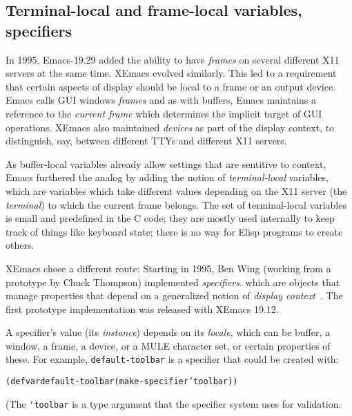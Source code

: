 \documentclass[format=acmsmall, review=false, screen=true]{acmart}
\newcommand \Elisp {Elisp}
\begin{document}



\subsection{Terminal-local and frame-local variables, specifiers}

In 1995, Emacs-19.29 added the ability to have \emph{frames} on
several different X11 servers at the same time.  XEmacs evolved
similarly.  This led to a requirement that certain aspects of display
should be local to a frame or an output device.  Emacs calls GUI
windows \emph{frames} and as with buffers, Emacs maintains a reference
to the \emph{current frame} which determines the implicit target of
GUI operations.  XEmacs also maintained \emph{devices} as part of
the display context, to distinguish, say, between different TTYs and
different X11 servers.

As buffer-local variables already allow settings that are sentitive to
context, Emacs furthered the analog by adding the notion of
\emph{terminal-local} variables, which are variables which take
different values depending on the X11 server (the \emph{terminal}) to
which the current frame belongs.  The set of terminal-local variables
is small and predefined in the C code; they are mostly used internally
to keep track of things like keyboard state; there is no way for
\Elisp{} programs to create others.

XEmacs chose a different route: Starting in 1995, Ben Wing (working
from a prototype by Chuck Thompson) implemented
\emph{specifiers}. which are objects that manage properties that
depend on a generalized notion of \emph{display
  context}~\cite{XEmacsLispRef1998}.  The first prototype
implementation was released with XEmacs 19.12.

A specifier's value (its \emph{instance}) depends on its
\emph{locale}, which can be buffer, a window, a frame, a device, or a MULE
character set, or certain properties of these.  For example,
\texttt{default-toolbar} is a specifier that could be created with:
%
\begin{alltt}
(defvar default-toolbar (make-specifier 'toolbar))
\end{alltt}
%
(The \verb|'toolbar| is a type argument that the specifier system uses
for validation.
\end{document}
